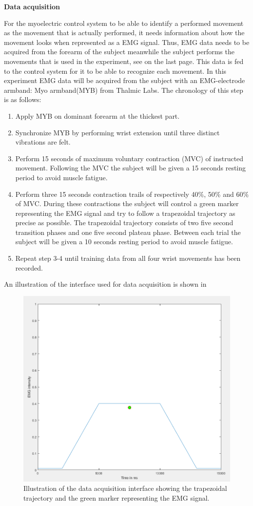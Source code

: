 \textbf{Data acquisition}

For the myoelectric control system to be able to identify a performed movement as the movement that is actually performed, it needs information about how the movement looks when represented as a EMG signal. Thus, EMG data needs to be acquired from the forearm of the subject meanwhile the subject performs the movements that is used in the experiment, see  on the last page. This data is fed to the control system for it to be able to recognize each movement. In this experiment EMG data will be acquired from the subject with an EMG-electrode armband: Myo armband(MYB) from Thalmic Labs. The chronology of this step is as follows:

\begin{enumerate}
	\item Apply MYB on dominant forearm at the thickest part.
	\item Synchronize MYB by performing wrist extension until three distinct vibrations are felt.
	\item Perform 15 seconds of maximum voluntary contraction (MVC) of instructed movement. Following the MVC the subject will be given a 15 seconds resting period to avoid muscle fatigue.
	\item Perform three 15 seconds contraction trails of respectively 40\%, 50\% and 60\% of MVC. During these contractions the subject will control a green marker representing the EMG signal and try to follow a trapezoidal trajectory as precise as possible. The trapezoidal trajectory consists of two five second transition phases and one five second plateau phase. Between each trial the subject will be given a 10 seconds resting period to avoid muscle fatigue.
	\item Repeat step 3-4 until training data from all four wrist movements has been recorded.
\end{enumerate}

An illustration of the interface used for data acquisition is shown in 

\begin{figure}[H]                 
	\includegraphics[width=.6\textwidth]{figures/xBackground/dataacqGUI}  
	\caption{Illustration of the data acquisition interface showing the trapezoidal trajectory and the green marker representing the EMG signal.}
	\label{fig:dataacqGUI} 
\end{figure}

